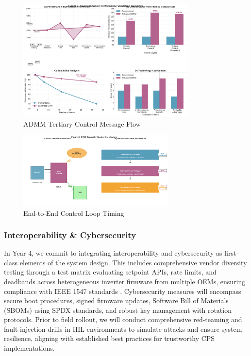 \documentclass[12pt]{article}
\begin{document}
\begin{figure}[H]
\centering
\includegraphics[width=0.8\textwidth]{figure4_performance_summary.pdf}
\caption{ADMM Tertiary Control Message Flow}
\end{figure}

\begin{figure}[H]
\centering
\includegraphics[width=0.7\textwidth]{figure3_system_architecture.pdf}
\caption{End-to-End Control Loop Timing}
\end{figure}

\subsubsection{Interoperability \& Cybersecurity}

In Year 4, we commit to integrating interoperability and cybersecurity as first-class elements of the system design. This includes comprehensive vendor diversity testing through a test matrix evaluating setpoint APIs, rate limits, and deadbands across heterogeneous inverter firmware from multiple OEMs, ensuring compliance with IEEE 1547 standards \cite{ieee1547}. Cybersecurity measures will encompass secure boot procedures, signed firmware updates, Software Bill of Materials (SBOMs) using SPDX standards, and robust key management with rotation protocols. Prior to field rollout, we will conduct comprehensive red-teaming and fault-injection drills in HIL environments to simulate attacks and ensure system resilience, aligning with established best practices for trustworthy CPS implementations.
\end{document}
